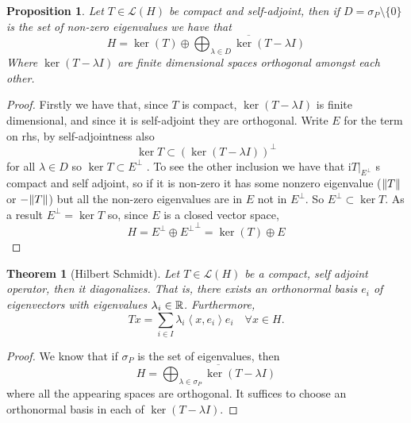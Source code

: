 \documentclass[12pt]{article}
\newtheorem{theorem}{Theorem}
\newtheorem{proposition}{Proposition}
\newcommand{\br}[1]{\left\langle#1\right\rangle}
\begin{document}
\begin{proposition}
	Let $T\in\mathcal{L}(H)$ be compact and self-adjoint, then if $D=\sigma_P\setminus\{0\}$ is the set of non-zero eigenvalues we have that
	\begin{equation*}
		H=\operatorname{ker}(T) \oplus \overline{\bigoplus_{\lambda \in D} \operatorname{ker}(T-\lambda I)}
	\end{equation*}
	Where $\operatorname{ker}(T-\lambda I)$ are finite dimensional spaces orthogonal amongst each other.
\end{proposition}
\begin{proof}
	Firstly we have that, since $T$ is compact, $\ker(T-\lambda I)$ is finite dimensional, and since it is self-adjoint they are orthogonal. Write $E$ for the term on rhs, by self-adjointness also
	\begin{equation*}
		\ker{T}\subset (\ker(T-\lambda I))^\perp
	\end{equation*}
	for all $\lambda\in D$ so $\ker{T}\subset E^\perp$  . To see the other inclusion we have that i$T|_{E^\perp}$ s compact and self adjoint, so if it is non-zero it has some nonzero eigenvalue ($\norm{T}$ or $-\norm{T}$) but all the non-zero eigenvalues are in $E$ not in $E^\perp$. So $E^\perp\subset\ker{T}$. As a result $E^\perp=\ker{T}$ so, since $E$ is a closed vector space,
	\begin{equation*}
		H=E^\perp\oplus {E^\perp}^\perp=\ker(T)\oplus E
	\end{equation*}
\end{proof}
\begin{theorem}[Hilbert Schmidt]\label{Hilber-Schmidt}
	Let $T\in\mathcal{L}(H)$ be a compact, self adjoint operator, then it diagonalizes. That is, there exists an orthonormal basis $e_i$ of eigenvectors with eigenvalues $\lambda_i\in{\mathbb R}$. Furthermore,
	\begin{equation*}
		Tx=\sum_{i\in I} \lambda_i\br{x,e_i}e_i\quad\forall x\in H.
	\end{equation*}
\end{theorem}
\begin{proof}
	We know that if $\sigma_P$ is the set of eigenvalues, then
	\begin{equation*}
		H= \overline{\bigoplus_{\lambda \in \sigma_P} \operatorname{ker}(T-\lambda I)}
	\end{equation*}
	where all the appearing spaces are orthogonal. It suffices to choose an orthonormal basis in each of $\operatorname{ker}(T-\lambda I)$.
\end{proof}
\end{document}
